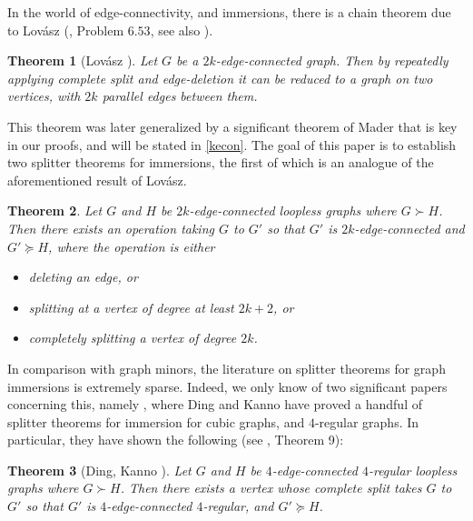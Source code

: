 \documentclass[letterpaper,11pt]{article}
\newtheorem{theorem}{Theorem}[section]
\theoremstyle{definition}
\begin{document}
In the world of edge-connectivity, and immersions, there is a chain theorem due to Lov\'{a}sz (\cite{MR1265492}, Problem $6.53$, see also \cite{MR1373655}). %


\begin{theorem}[Lov\'{a}sz \cite{MR1265492}]
Let $G$ be a $2k$-edge-connected graph. Then by repeatedly applying complete split  and edge-deletion it can be reduced to a graph on two vertices, with $2k$ parallel edges between them.
\end{theorem}



This theorem was later generalized by a significant theorem of Mader that is key in our proofs, and will be stated in  \cref{kecon}. The goal of this paper is to establish two splitter theorems for immersions, the first of which is an analogue of the aforementioned result of Lov\'{a}sz.


\begin{theorem}
\label{sp-thm1intro}
Let $G$ and $H$ be $2k$-edge-connected loopless graphs where $G \succ H$. Then there exists an operation taking $G$ to $G'$ so that $G'$ is $2k$-edge-connected and $G' \succeq H$, where the operation is either
\begin{itemize}
\item deleting an edge, or
\item splitting at a vertex of degree at least $2k+2$, or
\item completely splitting a vertex of degree $2k$.
\end{itemize}
\end{theorem}



In comparison with graph minors, the literature on splitter theorems for graph immersions is extremely sparse. Indeed, we only know of two significant papers concerning this, namely \cite{MR2216473,MR2646129}, where Ding and Kanno have proved a handful of splitter theorems for immersion for cubic graphs, and $4$-regular graphs. In particular, they have shown the following (see \cite{MR2646129}, Theorem 9):


\begin{theorem}[Ding, Kanno \cite{MR2646129}]
\label{DingKanno}
Let $G$ and $H$ be $4$-edge-connected $4$-regular loopless graphs where $G \succ  H$. Then there exists a vertex whose complete split takes $G$ to $G'$ so that $G'$ is $4$-edge-connected $4$-regular, and $G' \succeq H$.
\end{theorem}
\end{document}
